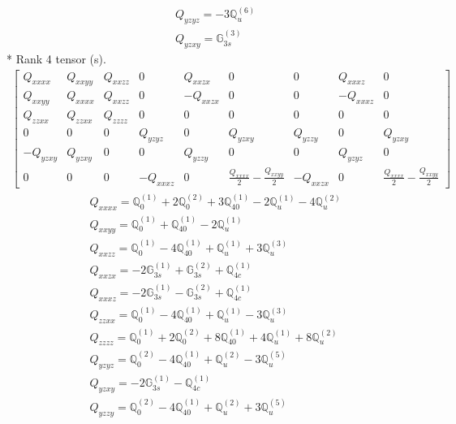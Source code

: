\documentclass[fleqn,8pt,landscape]{jsarticle}
\begin{document}
\begin{align*}
& Q_{yzyz} = - 3 \mathbb{Q}_{u}^{(6)} \\
& Q_{yzxy} = \mathbb{G}_{3s}^{(3)}
\end{align*}
* Rank 4 tensor (s).
\begin{align*}
\begin{bmatrix} Q_{xxxx} & Q_{xxyy} & Q_{xxzz} & 0 & Q_{xxzx} & 0 & 0 & Q_{xxxz} & 0 \\ Q_{xxyy} & Q_{xxxx} & Q_{xxzz} & 0 & - Q_{xxzx} & 0 & 0 & - Q_{xxxz} & 0 \\ Q_{zzxx} & Q_{zzxx} & Q_{zzzz} & 0 & 0 & 0 & 0 & 0 & 0 \\ 0 & 0 & 0 & Q_{yzyz} & 0 & Q_{yzxy} & Q_{yzzy} & 0 & Q_{yzxy} \\ - Q_{yzxy} & Q_{yzxy} & 0 & 0 & Q_{yzzy} & 0 & 0 & Q_{yzyz} & 0 \\ 0 & 0 & 0 & - Q_{xxxz} & 0 & \frac{Q_{xxxx}}{2} - \frac{Q_{xxyy}}{2} & - Q_{xxzx} & 0 & \frac{Q_{xxxx}}{2} - \frac{Q_{xxyy}}{2} \end{bmatrix}
\end{align*}
\begin{align*}
& Q_{xxxx} = \mathbb{Q}_{0}^{(1)} + 2 \mathbb{Q}_{0}^{(2)} + 3 \mathbb{Q}_{40}^{(1)} - 2 \mathbb{Q}_{u}^{(1)} - 4 \mathbb{Q}_{u}^{(2)} \\
& Q_{xxyy} = \mathbb{Q}_{0}^{(1)} + \mathbb{Q}_{40}^{(1)} - 2 \mathbb{Q}_{u}^{(1)} \\
& Q_{xxzz} = \mathbb{Q}_{0}^{(1)} - 4 \mathbb{Q}_{40}^{(1)} + \mathbb{Q}_{u}^{(1)} + 3 \mathbb{Q}_{u}^{(3)} \\
& Q_{xxzx} = - 2 \mathbb{G}_{3s}^{(1)} + \mathbb{G}_{3s}^{(2)} + \mathbb{Q}_{4c}^{(1)} \\
& Q_{xxxz} = - 2 \mathbb{G}_{3s}^{(1)} - \mathbb{G}_{3s}^{(2)} + \mathbb{Q}_{4c}^{(1)} \\
& Q_{zzxx} = \mathbb{Q}_{0}^{(1)} - 4 \mathbb{Q}_{40}^{(1)} + \mathbb{Q}_{u}^{(1)} - 3 \mathbb{Q}_{u}^{(3)} \\
& Q_{zzzz} = \mathbb{Q}_{0}^{(1)} + 2 \mathbb{Q}_{0}^{(2)} + 8 \mathbb{Q}_{40}^{(1)} + 4 \mathbb{Q}_{u}^{(1)} + 8 \mathbb{Q}_{u}^{(2)} \\
& Q_{yzyz} = \mathbb{Q}_{0}^{(2)} - 4 \mathbb{Q}_{40}^{(1)} + \mathbb{Q}_{u}^{(2)} - 3 \mathbb{Q}_{u}^{(5)} \\
& Q_{yzxy} = - 2 \mathbb{G}_{3s}^{(1)} - \mathbb{Q}_{4c}^{(1)} \\
& Q_{yzzy} = \mathbb{Q}_{0}^{(2)} - 4 \mathbb{Q}_{40}^{(1)} + \mathbb{Q}_{u}^{(2)} + 3 \mathbb{Q}_{u}^{(5)}
\end{align*}
\end{document}
